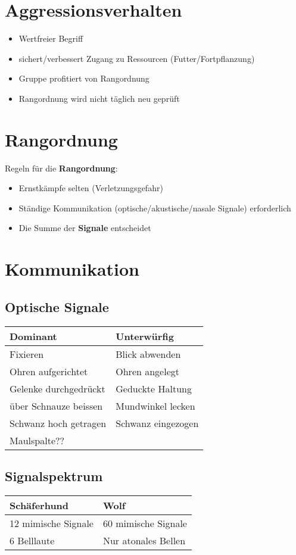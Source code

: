 \section{Aggressionsverhalten}
\begin{itemize}
    \item Wertfreier Begriff
    \item sichert/verbessert Zugang zu Ressourcen (Futter/Fortpflanzung)
    \item Gruppe profitiert von Rangordnung
    \item Rangordnung wird nicht täglich neu geprüft
\end{itemize}

\section{Rangordnung}
Regeln für die \textbf{Rangordnung}:
\begin{itemize}
    \item Ernstkämpfe selten (Verletzungsgefahr)
    \item Ständige Kommunikation (optische/akustische/nasale Signale) erforderlich
    \item Die Summe der \textbf{Signale} entscheidet
\end{itemize}

\section{Kommunikation}

    \subsection{Optische Signale}
    \begin{tabular}{l|l}
        \textbf{Dominant} & \textbf{Unterwürfig} \\
        \hline
        Fixieren & Blick abwenden \\
        Ohren aufgerichtet & Ohren angelegt \\
        Gelenke durchgedrückt & Geduckte Haltung \\
        über Schnauze beissen & Mundwinkel lecken \\
        Schwanz hoch getragen & Schwanz eingezogen \\
        Maulspalte?? \\
    \end{tabular}

    \subsection{Signalspektrum}
        \begin{tabular}{l|l}
            \textbf{Schäferhund} & \textbf{Wolf} \\
            \hline
            12 mimische Signale & 60 mimische Signale \\
            6 Belllaute & Nur atonales Bellen \\
        \end{tabular}

